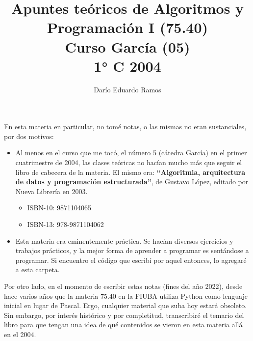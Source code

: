 \documentclass{article}
\title{Apuntes teóricos de Algoritmos y Programación I (75.40) \\ Curso García (05) \\ 1° C 2004}
\author{Darío Eduardo Ramos}
\begin{document}
\maketitle
\newpage

En esta materia en particular, no tomé notas, o las mismas no eran sustanciales, por dos motivos:

\begin{itemize}
\item Al menos en el curso que me tocó, el número 5 (cátedra García) en el primer cuatrimestre de 2004, las clases teóricas no hacían mucho más que seguir el libro de cabecera de la materia. El mismo era: \textbf{``Algoritmia, arquitectura de datos y programación estructurada''}, de Gustavo López, editado por Nueva Librería en 2003.
	\begin{itemize}
	\item ISBN-10: 9871104065
	\item ISBN-13: 978-9871104062
	\end{itemize}
\item Esta materia era eminentemente práctica. Se hacían diversos ejercicios y trabajos prácticos, y la mejor forma de aprender a programar es sentándose a programar. Si encuentro el código que escribí por aquel entonces, lo agregaré a esta carpeta.
\end{itemize}

Por otro lado, en el momento de escribir estas notas (fines del año 2022), desde hace varios años que la materia 75.40 en la FIUBA utiliza Python como lenguaje inicial en lugar de Pascal. Ergo, cualquier material que suba hoy estará obsoleto. Sin embargo, por interés histórico y por completitud, transcribiré el temario del libro para que tengan una idea de qué contenidos se vieron en esta materia allá en el 2004.
\end{document}
